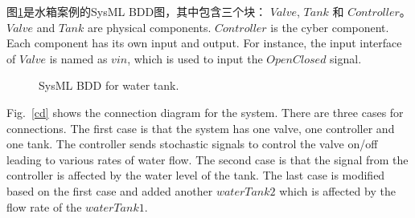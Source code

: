 图\ref{myad}是水箱案例的SysML BDD图，其中包含三个块： $Valve$, $Tank$ 和 $Controller$。 $Valve$ and $Tank$ are physical components. $Controller$ is the cyber component. Each component has its own input and output. For instance, the input interface of $Valve$ is named as $vin$, which is used to input the $OpenClosed$ signal. 
\begin{figure}[htbp]
	\caption{SysML BDD for water tank.}
	\label{myad}
\end{figure}

Fig.~\ref{cd} shows the connection diagram for the system. There are three cases for connections. The first case is that the system has one valve, one controller and one tank. The controller sends stochastic signals to control the valve on/off leading to various rates of water flow. The second case is that the signal from the controller is affected by the water level of the tank. The last case is modified based on the first case and added another $waterTank2$ which is affected by the flow rate of the $waterTank1$.

